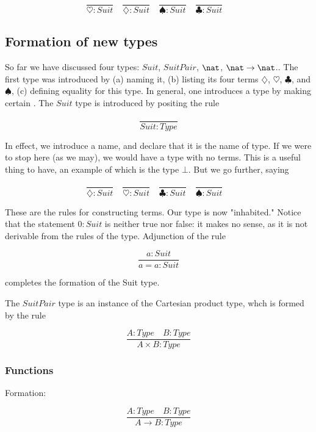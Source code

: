 
$$
\frac{}{\heartsuit : Suit} \quad
 \frac{}{\diamondsuit : Suit} \quad
 \frac{}{\spadesuit : Suit} \quad
 \frac{}{\clubsuit : Suit} \quad
$$


\subsection{Formation of new types}

So far we have discussed four types: $Suit$, $SuitPair$, $\nat$, $\nat \to \nat$..  The first type was introduced by (a) naming it, (b) listing its four terms $\diamondsuit$, $\heartsuit$, $\clubsuit$, and $\spadesuit$, (c) defining equality for this type.  In general, one introduces a type by making certain .  The $Suit$ type is introduced by positing the rule

$$
\frac{}{Suit : Type}
$$

In effect, we introduce a name, and declare that it is the name of type.  If we were to stop here (as we may), we would have a type with no terms.  This is a useful thing to have, an example of which is the type $\bot$.  But we go further, saying

$$
\frac{}{\diamondsuit : Suit} \quad
\frac{}{\heartsuit : Suit} \quad
\frac{}{\clubsuit : Suit} \quad
\frac{}{\spadesuit : Suit} \quad
$$

These are the rules for constructing terms.  Our type is now "inhabited."
Notice that the statement $0 : Suit$  is neither true nor false: it makes no sense, as it is not derivable from the rules of the type. Adjunction of the rule

$$
\frac{a : Suit}{a = a : Suit}
$$

completes the formation of the Suit type.

The $SuitPair$ type is an instance of the Cartesian product type, whch is formed by the rule

\begin{equation}
\frac{A : Type \quad B : Type}{A\times B : Type}
\end{equation}


\subsubsection{Functions}

Formation:

\begin{equation}
\frac{A : Type \quad B : Type }{A \to B : Type}
\end{equation}


